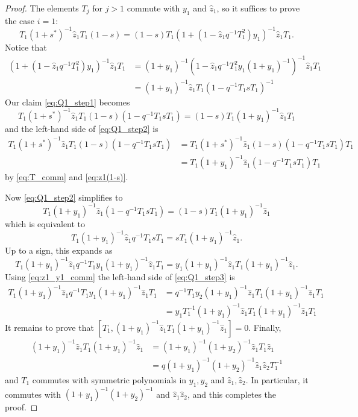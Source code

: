 \documentclass[reqno]{amsart}
\theoremstyle{plain}
\theoremstyle{definition}
\theoremstyle{remark}
\newcommand{\z}{\widehat{z}}
\newcommand{\<}{\langle}
\renewcommand{\>}{\rangle}
\begin{document}
\begin{proof}
    The elements $T_j$ for $j>1$ commute with $y_1$ and $\z_1$, so it suffices to prove the case $i=1$:
    \begin{equation}
        \label{eq:Q1_step1}
        T_1(1+s^*)^{-1} \z_1 T_1 (1-s) = (1-s) T_1 \left( 1 + \left( 1 - \z_1 q^{-1} T^2_1 \right) y_1 \right)^{-1} \z_1 T_1.
    \end{equation}
    Notice that
    \begin{align*}
        \left( 1 + \left( 1 - \z_1 q^{-1} T^2_1 \right) y_1 \right)^{-1} \z_1 T_1 &= (1+y_1)^{-1} \left( 1 - \z_1 q^{-1} T^2_1  y_1 (1+y_1)^{-1} \right)^{-1} \z_1 T_1 \\
        & = (1+y_1)^{-1} \z_1 T_1 ( 1 - q^{-1} T_1 s T_1)^{-1} 
    \end{align*}
    Our claim \eqref{eq:Q1_step1} becomes
    \begin{equation}
        \label{eq:Q1_step2}
        T_1(1+s^*)^{-1} \z_1 T_1 (1-s) (1 - q^{-1} T_1 s T_1) = (1-s) T_1 (1+y_1)^{-1} \z_1 T_1
    \end{equation}
    and the left-hand side of \eqref{eq:Q1_step2} is
    \begin{align*}
        T_1(1+s^*)^{-1} \z_1 T_1 (1-s) (1 - q^{-1} T_1 s T_1) &= T_1(1+s^*)^{-1} \z_1 (1-s) (1 - q^{-1} T_1 s T_1) T_1  \\
        &= T_1 (1 + y_1)^{-1} \z_1 ( 1 - q^{-1} T_1 s T_1) T_1 
    \end{align*}
    by \eqref{eq:T_comm} and \eqref{eq:z1(1-s)}.

    Now \eqref{eq:Q1_step2} simplifies to
    \[ T_1 (1 + y_1)^{-1} \z_1 (1 - q^{-1} T_1 s T_1) = (1-s) T_1 (1 + y_1)^{-1} \z_1 \]
    which is equivalent to 
    \[ T_1 (1 + y_1)^{-1} \z_1 q^{-1} T_1 s T_1 = s T_1 (1 + y_1)^{-1} \z_1. \]
    Up to a sign, this expands as
    \begin{equation}
        \label{eq:Q1_step3}
        T_1 (1 + y_1)^{-1} \z_1 q^{-1} T_1 y_1 (1 + y_1)^{-1} \z_1 T_1 = y_1 (1 + y_1)^{-1} \z_1 T_1 (1 + y_1)^{-1} \z_1.
    \end{equation}
    Using \eqref{eq:z1_y1_comm} the left-hand side of \eqref{eq:Q1_step3} is
    \begin{align*}
        T_1 (1 + y_1)^{-1} \z_1 q^{-1} T_1 y_1 (1 + y_1)^{-1} \z_1 T_1  & = q^{-1} T_1 y_2 (1 + y_1)^{-1} \z_1  T_1  (1 + y_1)^{-1} \z_1 T_1 \\
        & = y_1 T_1^{-1} (1 + y_1)^{-1} \z_1  T_1 (1 + y_1)^{-1} \z_1 T_1
    \end{align*}
    It remains to prove that $[T_1, (1 + y_1)^{-1} \z_1 T_1 (1 + y_1)^{-1} \z_1] = 0$.
    Finally,
    \begin{align*}
        (1 + y_1)^{-1} \z_1 T_1 (1 + y_1)^{-1} \z_1 &= (1 + y_1)^{-1} (1 + y_2)^{-1} \z_1 T_1 \z_1 \\
        & = q (1 + y_1)^{-1} (1 + y_2)^{-1} \z_1 \z_2 T_1^{-1}
    \end{align*}
    and $T_1$ commutes with symmetric polynomials in $y_1, y_2$ and $\z_1, \z_2$. In particular, it commutes with $(1 + y_1)^{-1} (1 + y_2)^{-1}$ and $\z_1  \z_2$, and this completes the proof.
\end{proof}
\end{document}
